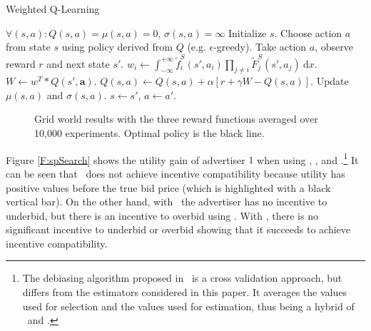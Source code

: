 \begin{algorithm}[tb]
   \caption{Weighted Q-Learning}
   \label{alg:W Q-Learning}
\begin{algorithmic}
    $\forall(s, a): Q(s, a) = \mu(s, a) = 0$, $\sigma(s,a) = \infty$
   \REPEAT
   \STATE Initialize $s$.
   \REPEAT
   \STATE Choose action $a$ from state $s$ using policy derived from $Q$ (e.g. $\epsilon$-greedy).
   \STATE Take action $a$, observe reward $r$ and next state $s'$.
   \STATE $w_i \leftarrow \int_{-\infty}^{+\infty} \tilde{f}_i^S(s', a_i) \prod_{j\neq i}\tilde{F}_j^S(s', a_j)~\mathrm{d}x$.
   \ENDFOR
   \STATE $W \gets w^T * Q(s', \mathbf{a})$.
   \STATE $Q(s, a) \gets Q(s, a) + \alpha[r + \gamma W - Q(s, a)]$.
   \STATE Update $\mu(s,a)$ and $\sigma(s, a)$.
   \STATE $s \gets s'$, $a \gets a'$.
   \UNTIL
\end{algorithmic}
\end{algorithm}


\begin{figure*}[t]
    \begin{minipage}{\textwidth}
    \centering 
    \setlength\figureheight{8cm}
    \setlength\figurewidth{4cm}
    \caption{Grid world results with the three reward functions averaged over 10,000 experiments. Optimal policy is the black line.}\label{F:grid}
    \end{minipage}
\end{figure*}


Figure \ref{F:spSearch} shows the utility gain of advertiser $1$ when using \ME, \CV, and \WE.\footnote{The debiasing algorithm proposed in~\cite{xu2013mab} is a cross validation approach, but differs from the estimators considered in this paper. It averages the values used for selection and the values used for estimation, thus being a hybrid of \CV~and \ME.} 
It can be seen that \ME ~does not achieve incentive compatibility because utility has positive values before the true bid price (which is highlighted with a black vertical bar). On the other hand, with \CV~the advertiser has no incentive to underbid, but there is an incentive to overbid using \CV. With \WE, there is no significant incentive to underbid or overbid showing that it succeeds to achieve incentive compatibility.

